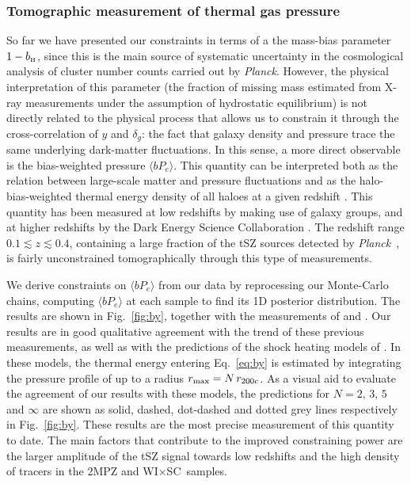 \documentclass[useAMS,usenatbib]{mn2e}
\newcommand{\wisc}{WI$\times$SC}
\def\bH{b_{\scriptscriptstyle\rm H}}
\def\planck{{\it Planck\/}}
\begin{document}
    \subsubsection{Tomographic measurement of thermal gas pressure}\label{ssec:results.fid.bpe}
      So far we have presented our constraints in terms of a the mass-bias parameter $1-\bH$, since this is the main source of systematic uncertainty in the cosmological analysis of cluster number counts carried out by \planck. However, the physical interpretation of this parameter (the fraction of missing mass estimated from X-ray measurements under the assumption of hydrostatic equilibrium) is not directly related to the physical process that allows us to constrain it through the cross-correlation of $y$ and $\delta_g$: the fact that galaxy density and pressure trace the same underlying dark-matter fluctuations. In this sense, a more direct observable is the bias-weighted pressure $\langle bP_e\rangle$. This quantity can be interpreted both as the relation between large-scale matter and pressure fluctuations and as the halo-bias-weighted thermal energy density of all haloes at a given redshift \citep{2017JCAP...11..040B}. This quantity has been measured at low  redshifts by \cite{2017MNRAS.467.2315V} making use of galaxy groups, and at higher redshifts by the Dark Energy Science Collaboration \citep{2019arXiv190413347P}. The redshift range $0.1\lesssim z\lesssim0.4$, containing a large fraction of the tSZ sources detected by \planck\ \citep{2016A&A...594A..27P}, is fairly unconstrained tomographically through this type of measurements.

      We derive constraints on $\langle bP_e\rangle$ from our data by reprocessing our Monte-Carlo chains, computing $\langle bP_e\rangle$ at each sample to find its 1D posterior distribution. The results are shown in Fig.\!~\ref{fig:by}, together with the measurements of \cite{2017MNRAS.467.2315V} and \cite{2019arXiv190413347P}. Our results are in good qualitative agreement with the trend of these previous measurements, as well as with the predictions of the shock heating models of \cite{2012ApJ...758...75B}. In these models, the thermal energy entering Eq.\!~\ref{eq:by} is estimated by integrating the pressure profile of \cite{2012ApJ...758...75B} up to a radius $r_{\rm max}=N\,r_{200c}$. As a visual aid to evaluate the agreement of our results with these models, the predictions for $N=2,\,3,\,5$ and $\infty$ are shown as solid, dashed, dot-dashed and dotted grey lines respectively in Fig.\!~\ref{fig:by}. These results are the most precise measurement of this quantity to date. The main factors that contribute to the improved constraining power are the larger amplitude of the tSZ signal towards low redshifts and the high density of tracers in the 2MPZ and \wisc\ samples.
\end{document}

